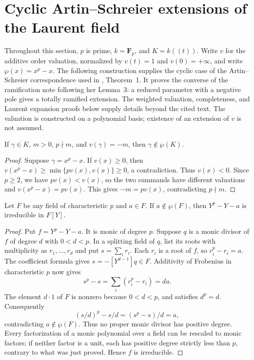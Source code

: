 \section{Cyclic Artin--Schreier extensions of the Laurent field}

Throughout this section, $p$ is prime, $k=\mathbf F_p$, and
$K=k((t))$. Write $v$ for the additive order valuation, normalized by
$v(t)=1$ and $v(0)=+\infty$, and write $\wp(x)=x^p-x$.
The following construction supplies the cyclic case of the
Artin--Schreier correspondence used in \cite{Camina1997}, Theorem~1.
It proves the converse of the ramification note following her Lemma~3:
a reduced parameter with a negative pole gives a totally ramified extension.
The weighted valuation, completeness, and Laurent expansion proofs below
supply details beyond the cited text. The valuation is constructed on a
polynomial basis; existence of an extension of $v$ is not assumed.

\begin{lemma}
\label{lem:artin-schreier-no-root-from-pole}
\leanok
If $\gamma\in K$, $m>0$, $p\nmid m$, and $v(\gamma)=-m$, then
$\gamma\notin\wp(K)$.
\end{lemma}

\begin{proof}
Suppose $\gamma=x^p-x$. If $v(x)\ge0$, then
$v(x^p-x)\ge\min\{p v(x),v(x)\}\ge0$, a contradiction.
Thus $v(x)<0$. Since $p\ge2$, we have $p v(x)<v(x)$, so the
two summands have different valuations and
$v(x^p-x)=p v(x)$. This gives $-m=p v(x)$, contradicting
$p\nmid m$.
\end{proof}

\begin{lemma}
\label{lem:artin-schreier-irreducible}
\leanok
Let $F$ be any field of characteristic $p$ and $a\in F$.
If $a\notin\wp(F)$, then $Y^p-Y-a$ is irreducible in $F[Y]$.
\end{lemma}

\begin{proof}
Put $f=Y^p-Y-a$. It is monic of degree $p$.
Suppose $q$ is a monic divisor of $f$ of degree $d$ with
$0<d<p$. In a splitting field of $q$, list its roots with
multiplicity as $r_1,\ldots,r_d$ and put $s=\sum_i r_i$.
Each $r_i$ is a root of $f$, so $r_i^p-r_i=a$.
The coefficient formula gives $s=-[Y^{d-1}]q\in F$.
Additivity of Frobenius in characteristic $p$ now gives
\[
 s^p-s=\sum_i(r_i^p-r_i)=d a.
\]
The element $d\cdot1$ of $F$ is nonzero because $0<d<p$,
and satisfies $d^p=d$. Consequently
\[
 (s/d)^p-s/d=(s^p-s)/d=a,
\]
contradicting $a\notin\wp(F)$.
Thus no proper monic divisor has positive degree. Every factorization
of a monic polynomial over a field can be rescaled to monic factors;
if neither factor is a unit, each has positive degree strictly less
than $p$, contrary to what was just proved. Hence $f$ is irreducible.
\end{proof}

